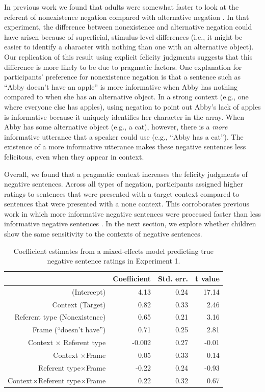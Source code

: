 \documentclass[man, noapacite]{apa2}
\begin{document}
In previous work we found that adults were somewhat faster to look at the referent of nonexistence negation compared with alternative negation \cite{nordmeyer2014b}. In that experiment, the difference between nonexistence and alternative negation could have arisen because of superficial, stimulus-level differences (i.e., it might be easier to identify a character with nothing than one with an alternative object). Our replication of this result using explicit felicity judgments suggests that this difference is more likely to be due to pragmatic factors. One explanation for participants' preference for nonexistence negation is that a sentence such as ``Abby doesn't have an apple'' is more informative when Abby has nothing compared to when she has an alternative object. In a strong context (e.g., one where everyone else has apples), using negation to point out Abby's lack of apples is informative because it uniquely identifies her character in the array. When Abby has some alternative object (e.g., a cat), however, there is a \emph{more} informative utterance that a speaker could use (e.g., ``Abby has a cat''). The existence of a more informative utterance makes these negative sentences less felicitous, even when they appear in context.

Overall, we found that a pragmatic context increases the felicity judgments of negative sentences. Across all types of negation, participants assigned higher ratings to sentences that were presented with a target context compared to sentences that were presented with a none context. This corroborates previous work in which more informative negative sentences were processed faster than less informative negative sentences \cite{nordmeyer2014}. In the next section, we explore whether children show the same sensitivity to the contexts of negative sentences.

\begin{table}[t]
\caption{\label{tab:s1} Coefficient estimates from a mixed-effects model predicting true negative sentence ratings in Experiment 1.}
\begin{center}
\small\addtolength{\tabcolsep}{-5pt}
\begin{tabular}{rrrr}
 \hline
 & Coefficient & Std. err. & t value \\
 \hline
(Intercept) & 4.13 & 0.24 & 17.14 \\
 Context (Target) & 0.82 & 0.33 & 2.46 \\
 Referent type (Nonexistence) & 0.65 & 0.21 & 3.16 \\
 Frame (``doesn't have'') & 0.71 & 0.25 & 2.81 \\
 Context $\times$ Referent type & -0.002 & 0.27 & -0.01 \\
 Context $\times$Frame & 0.05 & 0.33 & 0.14 \\
 Referent type$\times$Frame & -0.22 & 0.24 & -0.93 \\
 Context$\times$Referent type$\times$Frame & 0.22 & 0.32 & 0.67 \\
  \hline
\end{tabular}
\end{center}
\end{table}
\end{document}
